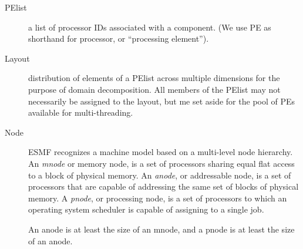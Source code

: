 
\begin{description}
\item[PElist] a list of processor IDs associated with a component. (We
  use PE as shorthand for processor, or ``processing element'').
\item[Layout] distribution of elements of a PElist across multiple
  dimensions for the purpose of domain decomposition. All members of
  the PElist may not necessarily be assigned to the layout, but me
  set aside for the pool of PEs available for multi-threading.
\item[Node] ESMF recognizes a machine model based on a multi-level node
  hierarchy. An \emph{mnode} or memory node, is a set of processors
  sharing equal flat access to a block of physical memory. An
  \emph{anode}, or addressable node, is a set of processors that are
  capable of addressing the same set of blocks of physical memory. A
  \emph{pnode}, or processing node, is a set of processors to which an
  operating system scheduler is capable of assigning to a single job.

  An anode is at least the size of an mnode, and a pnode is at least
  the size of an anode.
  

\end{description}
